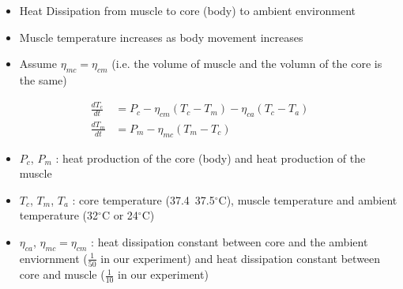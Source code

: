 \documentclass[landscape,paperwidth=42in,paperheight=52in,fontscale=0.27]{baposter} %
\newcommand{\compresslist}{ %
\setlength{\itemsep}{1pt}
\setlength{\parskip}{0pt}
\setlength{\parsep}{0pt}
}
\begin{document}
\begin{poster}
{\begin{multicols}{2}
\begin{itemize}\compresslist
\item Heat Dissipation from muscle to core (body) to ambient environment
\item Muscle temperature increases as body movement increases
\item Assume $\eta_{mc} = \eta_{cm}$ (i.e. the volume of muscle and the volumn of the core is the same)
\end{itemize} 
\end{multicols}

\begin{align*} 
\frac{dT_c}{dt} & = P_c - \eta_{cm} (T_c - T_m) - \eta_{ca} (T_c - T_a)\\
\frac{dT_m}{dt} & = P_m - \eta_{mc} (T_m - T_c)
\end{align*} 
\begin{itemize}\compresslist
\item $P_c$, $P_m$ : heat production of the core (body) and heat production of the muscle
\item $T_c$, $T_m$, $T_a$ : core temperature (37.4~37.5$^{\circ}$C), muscle temperature and ambient temperature (32$^{\circ}$C or 24$^{\circ}$C) 
\item $\eta_{ca}$, $\eta_{mc} = \eta_{cm}$  : heat dissipation constant between core and the ambient enviornment ($\frac{1}{50}$ in our experiment) and heat dissipation constant between core and muscle ($\frac{1}{10}$ in our experiment)
\end{itemize}

}
\end{poster}
\end{document}
